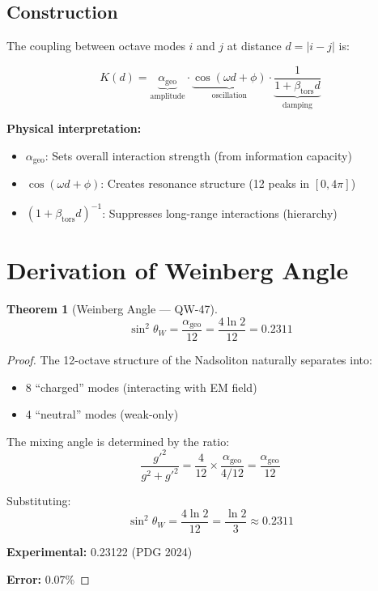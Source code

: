 \documentclass[11pt,a4paper]{book}
\newtheorem{theorem}{Theorem}[section]
\theoremstyle{remark}
\newcommand{\alphageo}{\alpha_{\text{geo}}}
\newcommand{\betators}{\beta_{\text{tors}}}
\begin{document}
\subsection{Construction}

The coupling between octave modes $i$ and $j$ at distance $d = |i - j|$ is:

\begin{equation}
K(d) = \underbrace{\alphageo}_{\text{amplitude}} \cdot \underbrace{\cos(\omega d + \phi)}_{\text{oscillation}} \cdot \underbrace{\frac{1}{1 + \betators d}}_{\text{damping}}
\end{equation}

\textbf{Physical interpretation:}
\begin{itemize}
    \item $\alphageo$: Sets overall interaction strength (from information capacity)
    \item $\cos(\omega d + \phi)$: Creates resonance structure (12 peaks in $[0, 4\pi]$)
    \item $(1 + \betators d)^{-1}$: Suppresses long-range interactions (hierarchy)
\end{itemize}

\section{Derivation of Weinberg Angle}

\begin{theorem}[Weinberg Angle --- QW-47]
\begin{equation}
\sin^2\theta_W = \frac{\alphageo}{12} = \frac{4\ln 2}{12} = 0.2311
\end{equation}
\end{theorem}

\begin{proof}
The 12-octave structure of the Nadsoliton naturally separates into:
\begin{itemize}
    \item 8 ``charged'' modes (interacting with EM field)
    \item 4 ``neutral'' modes (weak-only)
\end{itemize}

The mixing angle is determined by the ratio:
\begin{equation}
\frac{g'^2}{g^2 + g'^2} = \frac{4}{12} \times \frac{\alphageo}{4/12} = \frac{\alphageo}{12}
\end{equation}

Substituting:
\begin{equation}
\sin^2\theta_W = \frac{4\ln 2}{12} = \frac{\ln 2}{3} \approx 0.2311
\end{equation}

\textbf{Experimental:} 0.23122 (PDG 2024)

\textbf{Error:} 0.07\%
\end{proof}
\end{document}
